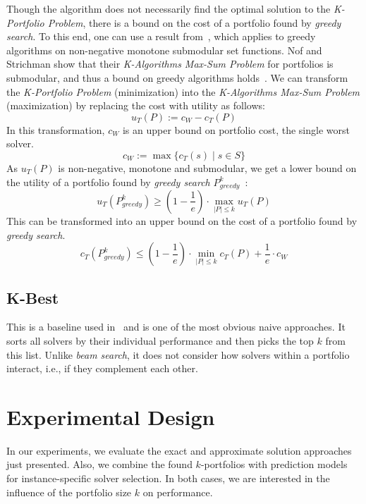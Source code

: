 \documentclass[conference]{IEEEtran}
\begin{document}
Though the algorithm does not necessarily find the optimal solution to the \emph{K-Portfolio Problem}, there is a bound on the cost of a portfolio found by \emph{greedy search}. 
To this end, one can use a result from~\cite{nemhauser1978analysis}, which applies to greedy algorithms on non-negative monotone submodular set functions.
Nof and Strichman show that their \emph{K-Algorithms Max-Sum Problem} for portfolios is submodular, and thus a bound on greedy algorithms holds~\cite{nof2020real}. 
We can transform the \emph{K-Portfolio Problem} (minimization) into the \emph{K-Algorithms Max-Sum Problem} (maximization) by replacing the cost with utility as follows:%
$$
u_{T}(P) := c_W - c_{T}(P)
$$
In this transformation, $c_W$ is an upper bound on portfolio cost, the single worst solver.%
$$
c_W := \max\{c_T(s) \mid s \in S\}
$$
As $u_{T}(P)$ is non-negative, monotone and submodular, we get a lower bound on the utility of a portfolio found by \emph{greedy search} $P_{greedy}^k$~\cite{nemhauser1978analysis, krause2014submodular}:%
$$
	u_{T}(P_{greedy}^k) \geq (1 - \frac{1}{e}) \cdot \max_{|P| \leq k}{u_{T}(P)}
$$
This can be transformed into an upper bound on the cost of a portfolio found by \emph{greedy search}.%
\begin{equation}
	c_{T}(P_{greedy}^k) \leq (1 - \frac{1}{e}) \cdot \min_{|P| \leq k}{c_{T}(P)} + \frac{1}{e} \cdot c_W
	\label{eq:upper-bound}
\end{equation}

\subsection{K-Best}
\label{sec:approach:k-best}

This is a baseline used in~\cite{nof2020real} and is one of the most obvious naive approaches. 
It sorts all solvers by their individual performance and then picks the top $k$ from this list.
Unlike \emph{beam search}, it does not consider how solvers within a portfolio interact, i.e., if they complement each other.

\section{Experimental Design}
\label{sec:experimental-design}

In our experiments, we evaluate the exact and approximate solution approaches just presented.
Also, we combine the found $k$-portfolios with prediction models for instance-specific solver selection. 
In both cases, we are interested in the influence of the portfolio size $k$ on performance. 
\end{document}
